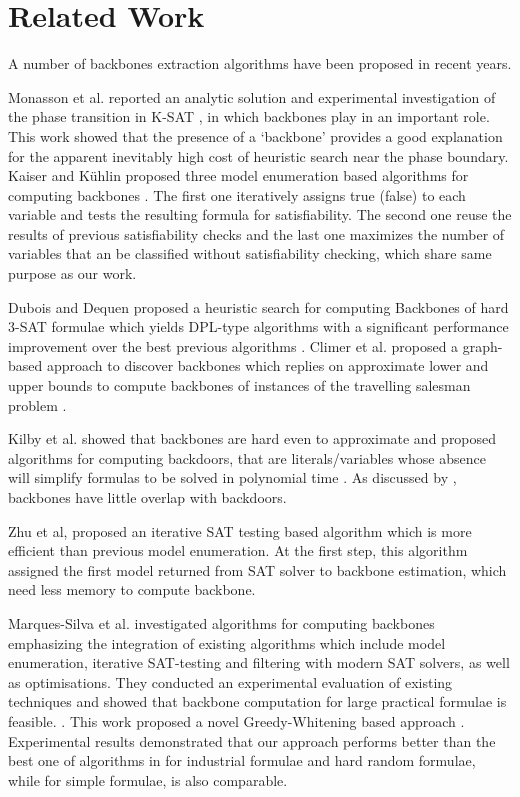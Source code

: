 \section{Related Work}\label{sec:relw}

A number of backbones extraction algorithms have been proposed in recent years.

Monasson et al. reported an analytic solution and experimental investigation of the phase transition in K-SAT \cite{MZKST99}, in which
backbones play in an important role. This work showed that the presence of a `backbone' provides a good explanation for the apparent inevitably high cost of heuristic search near the phase boundary. Kaiser and K\"{u}hlin proposed three model enumeration based algorithms for computing backbones \cite{KKW2001}.
The first one iteratively assigns true (false) to each variable and tests the resulting formula for satisfiability.
The second one reuse the results of previous satisfiability checks and the last one maximizes the number of variables that
an be classified without satisfiability checking, which share same purpose as our work.

Dubois and Dequen proposed a heuristic search for computing Backbones of hard 3-SAT formulae which yields DPL-type algorithms with a significant
performance improvement over the best previous algorithms \cite{DD2001}.
Climer et al. proposed a graph-based approach to discover backbones which replies on approximate lower and upper bounds to compute
backbones of instances of the travelling salesman problem \cite{CZ2002}. 


Kilby et al. showed that backbones are hard even to approximate and proposed algorithms for computing backdoors, that are literals/variables whose absence will simplify formulas to be solved in polynomial time \cite{KPS2005}. As discussed by \cite{KPS2005}, backbones have little overlap with backdoors.

 

Zhu et al, proposed an iterative SAT testing based algorithm \cite{ZWSM11,ZWM11} which is more efficient than previous model enumeration. At the first step, this algorithm assigned the first model returned from SAT solver to backbone estimation, which need less memory to compute backbone.

Marques-Silva et al.  investigated algorithms for computing backbones emphasizing the integration of existing algorithms which include model enumeration, iterative SAT-testing and filtering with modern SAT solvers, as well as optimisations. 
They conducted an experimental evaluation of existing techniques and showed that backbone computation for large practical formulae is feasible. \cite{MJML2010,JLMS12,JLM15}. 
This work proposed a novel Greedy-Whitening based approach \tool.
Experimental results demonstrated that our approach performs better than the best one of algorithms in \cite{MJML2010,JLMS12,JLM15} for industrial formulae and
hard random formulae, while for simple formulae, \tool is also comparable.


